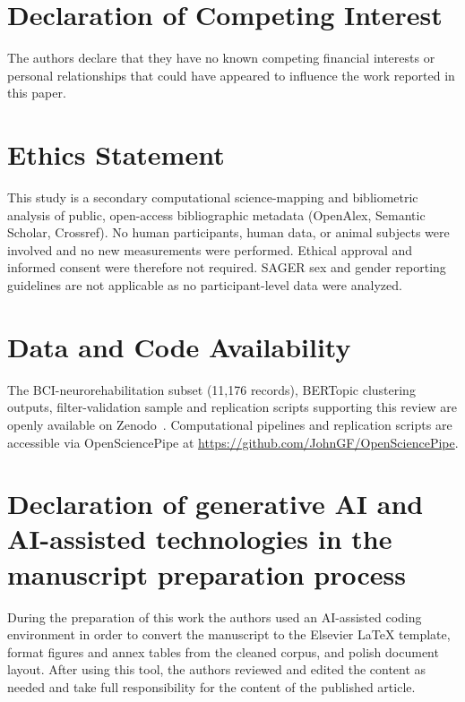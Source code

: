 \documentclass[preprint,12pt]{elsarticle}
\begin{document}
\section*{Declaration of Competing Interest}
The authors declare that they have no known competing financial interests or personal relationships that could have appeared to influence the work reported in this paper.

\section*{Ethics Statement}
This study is a secondary computational science-mapping and bibliometric analysis of public, open-access bibliographic metadata (OpenAlex, Semantic Scholar, Crossref). No human participants, human data, or animal subjects were involved and no new measurements were performed. Ethical approval and informed consent were therefore not required. SAGER sex and gender reporting guidelines are not applicable as no participant-level data were analyzed.

\section*{Data and Code Availability}
The BCI-neurorehabilitation subset (11,176 records), BERTopic clustering outputs, filter-validation sample and replication scripts supporting this review are openly available on Zenodo~\cite{zenodo2026eeg}.
Computational pipelines and replication scripts are accessible via OpenSciencePipe at \url{https://github.com/JohnGF/OpenSciencePipe}.

\section*{Declaration of generative AI and AI-assisted technologies in the manuscript preparation process}
During the preparation of this work the authors used an AI-assisted coding environment in order to convert the manuscript to the Elsevier LaTeX template, format figures and annex tables from the cleaned corpus, and polish document layout. After using this tool, the authors reviewed and edited the content as needed and take full responsibility for the content of the published article.
\end{document}
